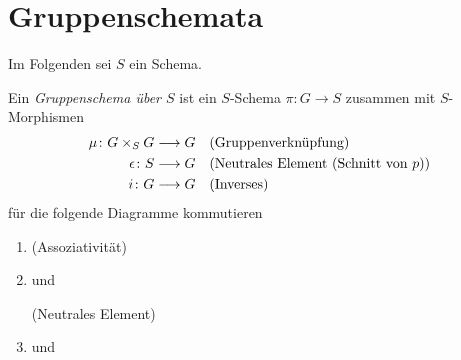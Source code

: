 \documentclass[german]{scrreprt}
\begin{document}
\chapter{Gruppenschemata}
Im Folgenden sei $S$ ein Schema.
\begin{Definition}[$S$"=Gruppenschema]
  Ein \emph{Gruppenschema über $S$} ist ein
  $S$-Schema $\pi\colon G\to S$ zusammen mit $S$-Morphismen
  \begin{align*}
    \mu\colon G\times_S G &\longrightarrow G
    &&\text{(Gruppenverknüpfung)}\\
    \epsilon\colon S&\longrightarrow G 
    &&\text{(Neutrales Element (Schnitt von $p$))}\\
    i\colon G &\longrightarrow G    
    &&\text{(Inverses)}
  \end{align*}
  für die folgende Diagramme kommutieren
  \begin{enumerate}[label=(\alph*)]
  \item
    \hfill(Assoziativität)
  \item
    und
    \hfill(Neutrales Element)
  \item
    und
\end{enumerate}
\end{Definition}
\end{document}
